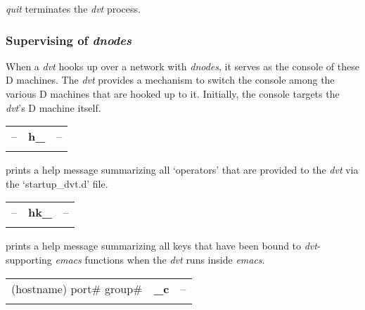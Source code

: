 \emph{quit} terminates the \emph{dvt} process.



\subsubsection{Supervising of \emph{dnodes}}

When a \emph{dvt} hooks up over a network with \emph{dnodes}, it serves as the console of these D machines. The \emph{dvt} provides a mechanism to switch the console among the various D machines that are hooked up to it. Initially, the console targets the \emph{dvt}'s D machine itself.\\  


\begin{tabular}{>{\sffamily}r>{\sffamily\bfseries}l>{\sffamily}l}
  -- & h\_ & --\\\\
\end{tabular}

\noindent prints a help message summarizing all `operators' that are provided to the \emph{dvt} via the `startup\_dvt.d' file.\\

\begin{tabular}{>{\sffamily}r>{\sffamily\bfseries}l>{\sffamily}l}
  -- & hk\_ & --\\\\
\end{tabular}

\noindent prints a help message summarizing all keys that have been bound to \emph{dvt}-supporting \emph{emacs} functions when the \emph{dvt} runs inside \emph{emacs}.\\

\begin{tabular}{>{\sffamily}r>{\sffamily\bfseries}l>{\sffamily}l}
(hostname) port\# group\# & \_c & --\\\\
\end{tabular}

